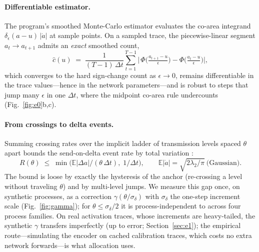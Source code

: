 \documentclass[10pt]{article}
\newcommand{\E}{\mathbb{E}}
\begin{document}
\paragraph{Differentiable estimator.}
The program's smoothed Monte-Carlo estimator \citep{howe2026levelcrossing}
evaluates the co-area integrand $\delta_\epsilon(a-u)\,|\dot a|$ at sample
points. On a sampled trace, the piecewise-linear segment
$a_t\!\to\!a_{t+1}$ admits an \emph{exact} smoothed count,
\begin{equation}
\hat c(u) \;=\; \frac{1}{(T-1)\,\Delta t}\sum_{t=1}^{T-1}
\Big|\,\Phi\big(\tfrac{a_{t+1}-u}{\epsilon}\big)-
\Phi\big(\tfrac{a_{t}-u}{\epsilon}\big)\Big|,
\label{eq:segment}
\end{equation}
which converges to the hard sign-change count as $\epsilon\to0$, remains
differentiable in the trace values---hence in the network parameters---and
is robust to steps that jump many $\epsilon$ in one $\Delta t$, where the
midpoint co-area rule undercounts (Fig.~\ref{fig:e0}b,c).

\paragraph{From crossings to delta events.}
Summing crossing rates over the implicit ladder of transmission levels
spaced $\theta$ apart bounds the send-on-delta event rate by total
variation \citep{miskowicz2006}:
\begin{equation}
R(\theta)\;\le\;\min\!\big(\E|\Delta a|/(\theta\,\Delta t),\;1/\Delta t\big),
\qquad \E|\dot a| = \sqrt{2\lambda_2/\pi}\ \text{(Gaussian)}.
\label{eq:bound}
\end{equation}
The bound is loose by exactly the hysteresis of the anchor (re-crossing a
level without traveling $\theta$) and by multi-level jumps. We measure this
gap once, on synthetic processes, as a correction
$\gamma(\theta/\sigma_\delta)$ with $\sigma_\delta$ the one-step increment
scale (Fig.~\ref{fig:gamma}); for $\theta\le\sigma_\delta/2$ it is
process-independent to \GammaSpreadSmallX{} across four process families.
On real activation traces, whose increments are heavy-tailed, the
synthetic $\gamma$ transfers imperfectly (up to
\AnalyticGammaWorstSCTwo{} error; Section~\ref{sec:e1}); the empirical
route---simulating the encoder on cached calibration traces, which costs no
extra network forwards---is what allocation uses.
\end{document}
